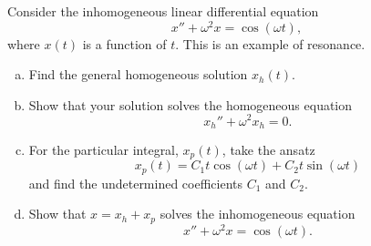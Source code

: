 \begin{problem}
Consider the inhomogeneous linear differential equation
\[
x''+\omega^2x=\cos(\omega t),
\]
where $x(t)$ is a function of $t$. This is an example of resonance.
\begin{enumerate}[(a)]
    \item Find the general homogeneous solution $x_h(t)$.
    \item Show that your solution solves the homogeneous equation
    \[
    x_h''+\omega^2x_h=0.
    \]
    \item For the particular integral, $x_p(t)$, take the ansatz
    \[
    x_p(t)=C_1t\cos(\omega t) + C_2 t\sin(\omega t)
    \]
    and find the undetermined coefficients $C_1$ and $C_2$.
    \item Show that $x=x_h+x_p$ solves the inhomogeneous equation
    \[
    x''+\omega^2 x = \cos(\omega t).
    \]
\end{enumerate}
\end{problem}





